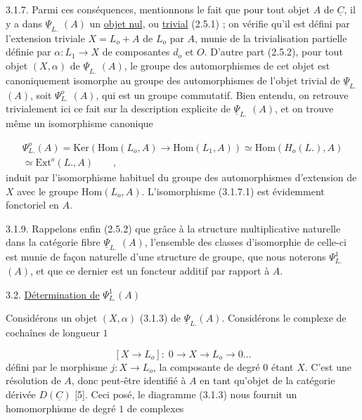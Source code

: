 3.1.7.  Parmi ces conséquences, mentionnons le fait que pour tout objet $A$ de $\underline{C}$, il y a dans $\underline{\Psi}_{L.}$ $(A)$ un \underline{objet nul}, ou \underline{trivial} (2.5.1) ; on vérifie qu'il est défini par l'extension triviale $X = L_o + A$ de $L_o$ par $A$, munie de la trivialisation partielle définie par $\alpha : L_1 \longrightarrow X$ de composantes $d_o$ et $O$. D'autre part (2.5.2), pour tout objet $(X,\alpha)$ de $\underline{\Psi}_{L.}$ $(A)$, le groupe des automorphismes de cet objet est canoniquement isomorphe au groupe des automorphismes de l'objet trivial de $\underline{\Psi}_{L.}$ $(A)$, soit $\Psi^{o}_{L.}$ $(A)$, qui est un groupe commutatif. Bien entendu, on retrouve trivialement ici ce fait sur la description explicite de $\underline{\Psi}_{L.}$ $(A)$, et on trouve même un isomorphisme canonique

\begin{multline}\tag{3.1.8}
\Psi^{o}_{L.} (A) = \mathrm{Ker}(\mathrm{Hom}(L_o,A) \to \mathrm{Hom}(L_1,A)) \simeq \mathrm{Hom}(H_o(L.),A) \\ \simeq \mathrm{Ext}^{o}(L.,A) \qquad ,
\end{multline}
induit par l'isomorphisme habituel du groupe des automorphismes d'extension de $X$ avec le groupe $\mathrm{Hom}(L_o,A)$. L'isomorphisme (3.1.7.1) est évidemment fonctoriel en $A$.

3.1.9.  Rappelons enfin (2.5.2) que grâce à la structure multiplicative naturelle dans la catégorie fibre $\underline{\Psi}_{L.}$ $(A)$, l'ensemble des classes d'isomorphie de celle-ci est munie de façon naturelle d'une structure de groupe, que nous noterons $\Psi^{1}_{L.}$ $(A)$, et que ce dernier est un foncteur additif par rapport à $A$.




3.2. \underline{Détermination de} $\Psi^1_{L.} (A)$

Considérons un objet $(X,\alpha)$ (3.1.3) de $\underline{\Psi}_{L.} (A)$. Considérons le complexe de cochaînes de longueur $1$

\begin{equation}\tag{3.2.1}
[X \to L_o] : \; 0 \longrightarrow X \longrightarrow L_o \longrightarrow 0 \ldots
\end{equation}
défini par le morphisme $j : X \longrightarrow L_o$, la composante de degré $0$ étant $X$. C'est une résolution de $A$, donc peut-être identifié à $A$ en tant qu'objet de la catégorie dérivée $D(\underline{C})$ [5]. Ceci posé, le diagramme (3.1.3) nous fournit un homomorphisme de degré $1$ de complexes

